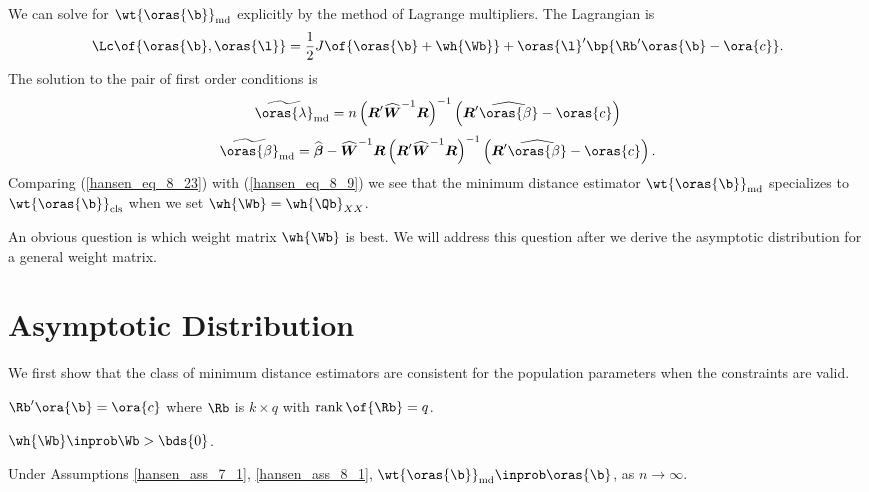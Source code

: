We can solve for $\wt{\oras{\b}}_{\text{md}}$ explicitly by the method of Lagrange multipliers. The Lagrangian is 
\begin{equation}
    \notag 
    \Lc\of{\oras{\b}, \oras{\l}} = \frac{1}{2} J\of{\oras{\b} + \wh{\Wb}} + \oras{\l}^{\prime} \bp{\Rb^{\prime} \oras{\b} - \ora{c}}.
\end{equation}
The solution to the pair of first order conditions is 
\begin{equation}
    \label{hansen_eq_8_22}
    \widetilde{\oras{\lambda}}_{\text{md}}=n\left(\boldsymbol{R}^{\prime} \widehat{\boldsymbol{W}}^{-1} \boldsymbol{R}\right)^{-1}\left(\boldsymbol{R}^{\prime} \widehat{\oras{\beta}}-\oras{c}\right)
\end{equation}
\begin{equation}
    \label{hansen_eq_8_23}
    \widetilde{\oras{\beta}}_{\text{md}}=\widehat{\boldsymbol{\beta}}-\widehat{\boldsymbol{W}}^{-1} \boldsymbol{R}\left(\boldsymbol{R}^{\prime} \widehat{\boldsymbol{W}}^{-1} \boldsymbol{R}\right)^{-1}\left(\boldsymbol{R}^{\prime} \widehat{\oras{\beta}}-\oras{c}\right) .
\end{equation}
Comparing (\ref{hansen_eq_8_23}) with (\ref{hansen_eq_8_9}) we see that the minimum distance estimator $\wt{\oras{\b}}_{\text{md}}$ specializes to $\wt{\oras{\b}}_{\text{cls}}$ when we set $\wh{\Wb} = \wh{\Qb}_{XX}$.

An obvious question is which weight matrix $\wh{\Wb}$ is best. We will address this question after we derive the asymptotic distribution for a general weight matrix.

\section{Asymptotic Distribution}

We first show that the class of minimum distance estimators are consistent for the population parameters when the constraints are valid.

\begin{assumption}
    \label{hansen_ass_8_1}
    $\Rb^{\prime} \ora{\b} = \ora{c}$ where $\Rb$ is $k \times q$ with $\operatorname{rank}\of{\Rb} = q$.
\end{assumption}

\begin{assumption}
    \label{hansen_ass_8_2}
    $\wh{\Wb} \inprob \Wb > \bds{0}$.
\end{assumption}

\begin{theorem}[Consistency]
    \label{hansen_thm_8_6}

    Under Assumptions \ref{hansen_ass_7_1}, \ref{hansen_ass_8_1}, $\wt{\oras{\b}}_{\text{md}} \inprob \oras{\b}$, as $n \rightarrow \infty$.
\end{theorem}


